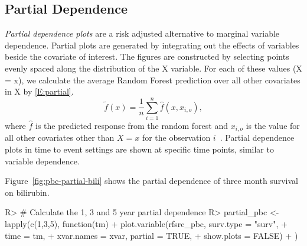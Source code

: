 \documentclass[nojss]{jss}
\begin{document}
\subsection{Partial Dependence}\label{S:partialDependence}

\emph{Partial dependence plots} are a risk adjusted alternative to marginal variable dependence. Partial plots are generated by integrating out the effects of variables beside the covariate of interest. The figures are constructed by selecting points evenly spaced along the distribution of the X variable. For each of these values (X = x), we calculate the average Random Forest prediction over all other covariates in X by \eqref{E:partial}.
\begin{equation}
\tilde{f}(x) = \frac{1}{n} \sum_{i = 1}^n \hat{f}(x, x_{i, o}), 
\label{E:partial}
\end{equation}
where $\hat{f}$ is the predicted response from the random forest and $x_{i, o}$ is the value for all other covariates other than $X = x$ for the observation $i$~\citep{Friedman:2000}. Partial dependence plots in time to event settings are shown at specific time points, similar to variable dependence.

Figure~\ref{fig:pbc-partial-bili} shows the partial dependence of three month survival on bilirubin. 

\begin{Schunk}
\begin{Sinput}
R> # Calculate the 1, 3 and 5 year partial dependence
R> partial_pbc <- lapply(c(1,3,5), function(tm){
+   plot.variable(rfsrc_pbc, surv.type = "surv", 
+                 time = tm, 
+                 xvar.names = xvar, partial = TRUE, 
+                 show.plots = FALSE)
+   })
\end{Sinput}
\end{Schunk}
\end{document}
